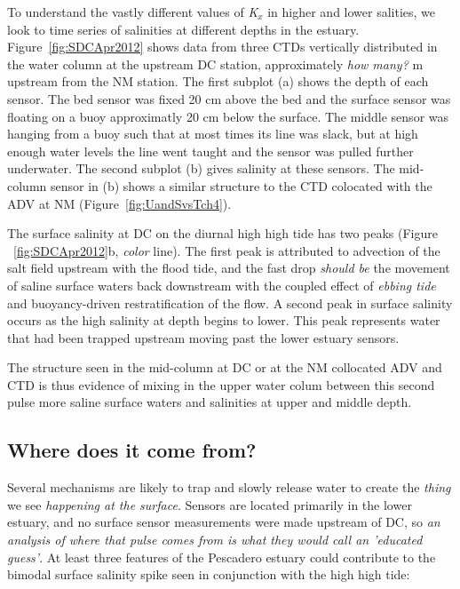 To understand the vastly different values of \emph{K$_x$} in higher and lower salities, we look to time series of salinities at different depths in the estuary. Figure~\ref{fig:SDCApr2012} shows data from three CTDs vertically distributed in the water column at the upstream DC station, approximately \emph{how many?} m upstream from the NM station. The first subplot (a) shows the depth of each sensor. The bed sensor was fixed 20 cm above the bed and the surface sensor was floating on a buoy approximatly 20 cm below the surface. The middle sensor was hanging from a buoy such that at most times its line was slack, but at high enough water levels the line went taught and the sensor was pulled further underwater. The second subplot (b) gives salinity at these sensors. The mid-column sensor in (b) shows a similar structure to the CTD colocated with the ADV at NM (Figure~\ref{fig:UandSvsTch4}).

The surface salinity at DC on the diurnal high high tide has two peaks (Figure ~\ref{fig:SDCApr2012}b, \emph{color} line). The first peak is attributed to advection of the salt field upstream with the flood tide, and the fast drop \emph{should be} the movement of saline surface waters back downstream with the coupled effect of \emph{ebbing tide} and buoyancy-driven restratification of the flow. A second peak in surface salinity occurs as the high salinity at depth begins to lower. This peak represents water that had been trapped upstream moving past the lower estuary sensors. 

The structure seen in the mid-column at DC or at the NM collocated ADV and CTD is thus evidence of mixing in the upper water colum between this second pulse more saline surface waters and salinities at upper and middle depth. 

\subsection{Where does it come from?}

Several mechanisms are likely to trap and slowly release water to create the \emph{thing} we see \emph{happening at the surface}. Sensors are located primarily in the lower estuary, and no surface sensor measurements were made upstream of DC, so \emph{an analysis of where that pulse comes from is what they would call an 'educated guess'}. At least three features of the Pescadero estuary could contribute to the bimodal surface salinity spike seen in conjunction with the high high tide:

